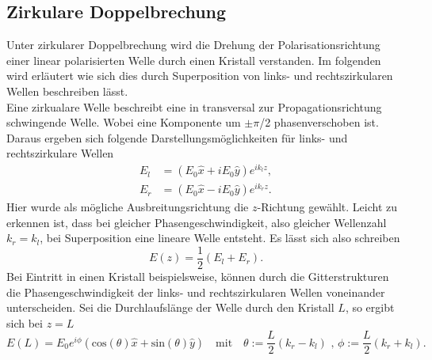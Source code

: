 \subsection{Zirkulare Doppelbrechung}

Unter zirkularer Doppelbrechung wird die Drehung der Polarisationsrichtung einer linear polarisierten Welle durch einen Kristall verstanden. 
Im folgenden wird erläutert wie sich dies durch Superposition von links- und rechtszirkularen Wellen beschreiben lässt.
\\
Eine zirkualare Welle beschreibt eine in transversal zur Propagationsrichtung schwingende Welle. Wobei eine Komponente um $\pm \pi$/2 phasenverschoben ist.
Daraus ergeben sich folgende Darstellungsmöglichkeiten für links- und rechtszirkulare Wellen
\begin{align*}
E_l &= (E_0 \hat{x} + i E_0 \hat{y}) e^{ik_l z}, \\
E_r &= (E_0 \hat{x} - i E_0 \hat{y}) e^{ik_r z}.
\end{align*}
Hier wurde als mögliche Ausbreitungsrichtung die $z$-Richtung gewählt. Leicht zu erkennen ist, dass bei gleicher Phasengeschwindigkeit, also gleicher Wellenzahl $k_r = k_l$, bei Superposition eine lineare Welle entsteht.
Es lässt sich also schreiben
\begin{equation*}
E(z) = \frac{1}{2} (E_l + E_r).
\end{equation*}
Bei Eintritt in einen Kristall beispielsweise, können durch die Gitterstrukturen die Phasengeschwindigkeit der links- und rechtszirkularen Wellen
voneinander unterscheiden. Sei die Durchlaufslänge der Welle durch den Kristall $L$, so ergibt sich bei $z=L$
\begin{equation*}
    E(L) = E_0 e^{i \phi} (\text{cos}(\theta)\hat{x} + \text{sin}(\theta) \hat{y} ) \quad \text{mit} \quad \theta := \frac{L}{2} (k_r - k_l) \text{ , } \phi := \frac{L}{2} (k_r + k_l).
\end{equation*}




